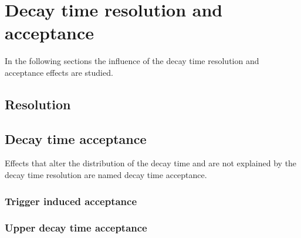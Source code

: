 
\section{Decay time resolution and acceptance}
\label{sec:measurement_of_sin2beta:resolution_and_acceptance}

In the following sections the influence of the decay time resolution and
acceptance effects are studied. 

\subsection{Resolution}
\label{sec:measurement_of_sin2beta:resolution_and_acceptance:resolution}

\subsection{Decay time acceptance}
\label{sec:measurement_of_sin2beta:resolution_and_acceptance:acceptance}

Effects that alter the distribution of the decay time and are not explained by the decay time resolution are named decay time acceptance. 

\subsubsection{Trigger induced acceptance}
\label{sec:measurement_of_sin2beta:resolution_and_acceptance:acceptance:lower}

\subsubsection{Upper decay time acceptance}
\label{sec:measurement_of_sin2beta:resolution_and_acceptance:acceptance:upper}